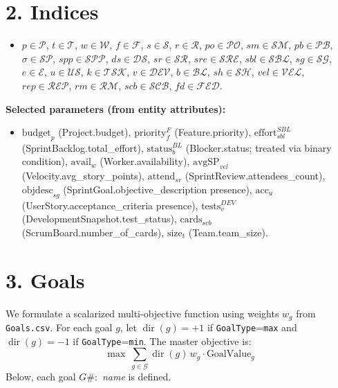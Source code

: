 \documentclass[11pt,a4paper]{article}
\begin{document}
\section{2. Indices}
\begin{itemize}[leftmargin=2em]
  \item $p \in \mathcal{P}$, $t \in \mathcal{T}$, $w \in \mathcal{W}$, $f \in \mathcal{F}$, $s \in \mathcal{S}$, $r \in \mathcal{R}$,
        $po \in \mathcal{PO}$, $sm \in \mathcal{SM}$, $pb \in \mathcal{PB}$, $\sigma \in \mathcal{SP}$,
        $spp \in \mathcal{SPP}$, $ds \in \mathcal{DS}$, $sr \in \mathcal{SR}$, $sre \in \mathcal{SRE}$,
        $sbl \in \mathcal{SBL}$, $sg \in \mathcal{SG}$, $e \in \mathcal{E}$, $u \in \mathcal{US}$,
        $k \in \mathcal{TSK}$, $v \in \mathcal{DEV}$, $b \in \mathcal{BL}$, $sh \in \mathcal{SH}$,
        $vel \in \mathcal{VEL}$, $rep \in \mathcal{REP}$, $rm \in \mathcal{RM}$, $scb \in \mathcal{SCB}$, $fd \in \mathcal{FED}$.
\end{itemize}

\noindent\textbf{Selected parameters (from entity attributes):}
\begin{itemize}[leftmargin=2em]
  \item $\text{budget}_p$ (Project.budget), $\text{priority}^F_f$ (Feature.priority), $\text{effort}^{SBL}_{sbl}$ (SprintBacklog.total\_effort),
        $\text{status}^{BL}_b$ (Blocker.status; treated via binary condition), $\text{avail}_w$ (Worker.availability),
        $\text{avgSP}_{vel}$ (Velocity.avg\_story\_points), $\text{attend}_{sr}$ (SprintReview.attendees\_count),
        $\text{objdesc}_{sg}$ (SprintGoal.objective\_description presence), $\text{acc}_{u}$ (UserStory.acceptance\_criteria presence),
        $\text{tests}^{DEV}_{v}$ (DevelopmentSnapshot.test\_status), $\text{cards}_{scb}$ (ScrumBoard.number\_of\_cards),
        $\text{size}_t$ (Team.team\_size).
\end{itemize}

\section{3. Goals}
We formulate a scalarized multi-objective function using weights $w_g$ from \texttt{Goals.csv}. For each goal $g$, let $\operatorname{dir}(g)=+1$ if \texttt{GoalType}=\texttt{max} and $\operatorname{dir}(g)=-1$ if \texttt{GoalType}=\texttt{min}. The master objective is:
\[
\max\ \sum_{g \in \mathcal{G}} \operatorname{dir}(g)\, w_g \cdot \text{GoalValue}_g
\]
Below, each goal $G\#:$ \textit{name} is defined.
\end{document}
